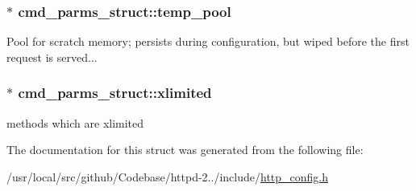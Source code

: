 \subsubsection[{\texorpdfstring{temp\+\_\+pool}{temp_pool}}]{$\ast$ cmd\+\_\+parms\+\_\+struct\+::temp\+\_\+pool}\hypertarget{structcmd__parms__struct_abb0a920b68fb95aa400babf7a7dcbf9d}{}\label{structcmd__parms__struct_abb0a920b68fb95aa400babf7a7dcbf9d}
Pool for scratch memory; persists during configuration, but wiped before the first request is served... 
\subsubsection[{\texorpdfstring{xlimited}{xlimited}}]{$\ast$ cmd\+\_\+parms\+\_\+struct\+::xlimited}\hypertarget{structcmd__parms__struct_affacae1704bf7c29bfbdb39a9e887ab9}{}\label{structcmd__parms__struct_affacae1704bf7c29bfbdb39a9e887ab9}
methods which are xlimited 

The documentation for this struct was generated from the following file\+:\begin{DoxyCompactItemize}
\item 
/usr/local/src/github/\+Codebase/httpd-\/2../include/\hyperlink{http__config_8h}{http\+\_\+config.\+h}\end{DoxyCompactItemize}
